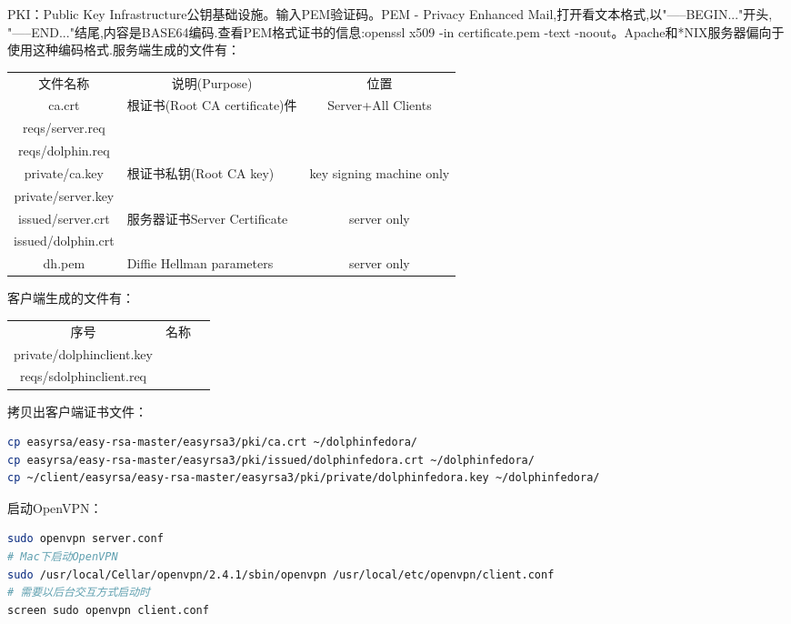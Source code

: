 \documentclass[letter]{book}
\begin{document}
PKI：Public Key Infrastructure公钥基础设施。输入PEM验证码。PEM - Privacy Enhanced Mail,打开看文本格式,以"-----BEGIN..."开头, "-----END..."结尾,内容是BASE64编码.查看PEM格式证书的信息:openssl x509 -in certificate.pem -text -noout。Apache和*NIX服务器偏向于使用这种编码格式.服务端生成的文件有：

\begin{tabular}{|c|p{5cm}|c|}
	\hline
	\multirow{1}{*}{文件名称}
	& \multicolumn{1}{c|}{说明(Purpose)} 
	& \multicolumn{1}{c|}{位置} \\			
	\cline{1-3}
	ca.crt  & 根证书(Root CA certificate)件 & Server+All Clients	\\
	\hline
	reqs/server.req  & &\\
	\hline
	reqs/dolphin.req  & &\\
	\hline
	private/ca.key & 根证书私钥(Root CA key) & key signing machine only\\
	\hline
	private/server.key && \\
	\hline
	issued/server.crt & 服务器证书Server Certificate & server only\\
	\hline
	issued/dolphin.crt && \\
	\hline
	dh.pem & Diffie Hellman parameters & server only \\
	\hline
\end{tabular}

客户端生成的文件有：

\begin{tabular}{|c|p{8cm}|c|}
	\hline
	\multirow{1}{*}{序号}
	& \multicolumn{1}{c|}{名称}  \\			
	\cline{1-2}
	private/dolphinclient.key  & \\
	\hline
	reqs/sdolphinclient.req & \\
	\hline
\end{tabular}

拷贝出客户端证书文件：

\begin{lstlisting}[language=Bash]
cp easyrsa/easy-rsa-master/easyrsa3/pki/ca.crt ~/dolphinfedora/
cp easyrsa/easy-rsa-master/easyrsa3/pki/issued/dolphinfedora.crt ~/dolphinfedora/
cp ~/client/easyrsa/easy-rsa-master/easyrsa3/pki/private/dolphinfedora.key ~/dolphinfedora/
\end{lstlisting}


启动OpenVPN：

\begin{lstlisting}[language=Bash]
sudo openvpn server.conf
# Mac下启动OpenVPN
sudo /usr/local/Cellar/openvpn/2.4.1/sbin/openvpn /usr/local/etc/openvpn/client.conf
# 需要以后台交互方式启动时
screen sudo openvpn client.conf
\end{lstlisting}
\end{document}
